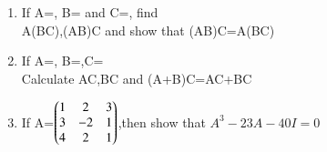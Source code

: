 \begin{enumerate}[label=\arabic*.,ref=\thesubsection.\theenumi]
   
    \item If A=, B= and C=, find\\A(BC),(AB)C and show that (AB)C=A(BC) \\   
    
     \item If A=, B=,C=\\Calculate AC,BC and (A+B)C=AC+BC\\

    \item If A=$\begin{pmatrix}1 &2 &3\\3 &-2 &1\\4 &2 &1\end{pmatrix}$,then show that $A^3-23A-40I=0$
    
    
    

\end{enumerate}
